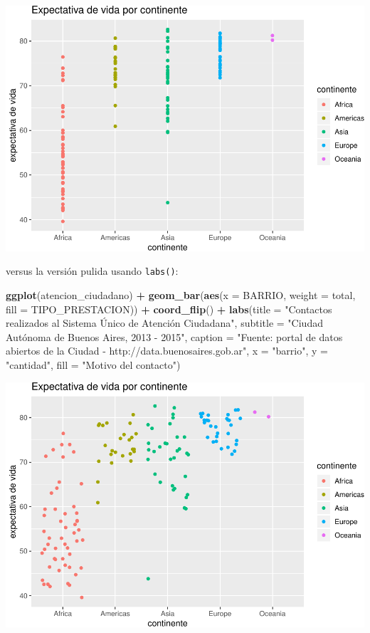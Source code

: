 \documentclass[]{book}
\newenvironment{Shaded}{\begin{snugshade}}{\end{snugshade}}
\newcommand{\KeywordTok}[1]{\textcolor[rgb]{0.13,0.29,0.53}{\textbf{#1}}}
\newcommand{\DataTypeTok}[1]{\textcolor[rgb]{0.13,0.29,0.53}{#1}}
\newcommand{\StringTok}[1]{\textcolor[rgb]{0.31,0.60,0.02}{#1}}
\newcommand{\OperatorTok}[1]{\textcolor[rgb]{0.81,0.36,0.00}{\textbf{#1}}}
\newcommand{\NormalTok}[1]{#1}
\begin{document}
\includegraphics{ciencia_de_datos_politicas_publicas_files/figure-latex/unnamed-chunk-104-1.pdf}

versus la versión pulida usando \texttt{labs()}:

\begin{Shaded}
\begin{Highlighting}[]
\KeywordTok{ggplot}\NormalTok{(atencion_ciudadano) }\OperatorTok{+}
\StringTok{    }\KeywordTok{geom_bar}\NormalTok{(}\KeywordTok{aes}\NormalTok{(}\DataTypeTok{x =}\NormalTok{ BARRIO, }\DataTypeTok{weight =}\NormalTok{ total, }\DataTypeTok{fill =}\NormalTok{ TIPO_PRESTACION)) }\OperatorTok{+}
\StringTok{    }\KeywordTok{coord_flip}\NormalTok{() }\OperatorTok{+}
\StringTok{    }\KeywordTok{labs}\NormalTok{(}\DataTypeTok{title =} \StringTok{"Contactos realizados al Sistema Único de Atención Ciudadana"}\NormalTok{,}
         \DataTypeTok{subtitle =} \StringTok{"Ciudad Autónoma de Buenos Aires, 2013 - 2015"}\NormalTok{,}
         \DataTypeTok{caption =} \StringTok{"Fuente: portal de datos abiertos de la Ciudad - http://data.buenosaires.gob.ar"}\NormalTok{,}
         \DataTypeTok{x =} \StringTok{"barrio"}\NormalTok{,}
         \DataTypeTok{y =} \StringTok{"cantidad"}\NormalTok{,}
         \DataTypeTok{fill =} \StringTok{"Motivo del contacto"}\NormalTok{)}
\end{Highlighting}
\end{Shaded}

\includegraphics{ciencia_de_datos_politicas_publicas_files/figure-latex/unnamed-chunk-105-1.pdf}
\end{document}
